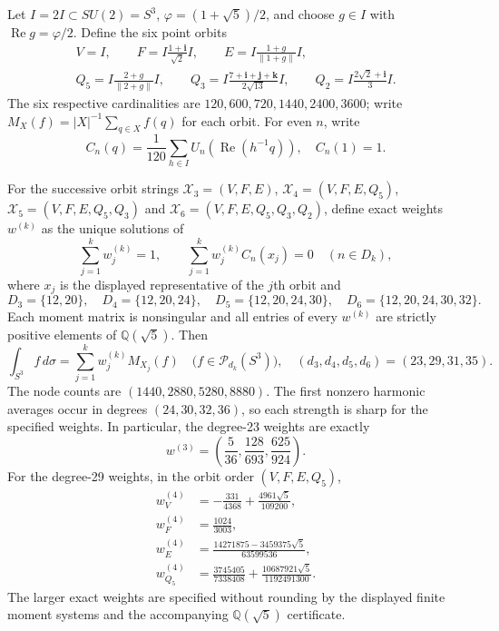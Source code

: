 \documentclass[11pt]{article}
\begin{document}
Let $I=2I\subset SU(2)=S^3$, $\varphi=(1+\sqrt5)/2$, and choose
$g\in I$ with $\operatorname{Re}g=\varphi/2$. Define the six point orbits
\[
\begin{gathered}
V=I,\qquad F=I\frac{1+\mathbf i}{\sqrt2}I,\qquad
E=I\frac{1+g}{\|1+g\|}I,\\
Q_5=I\frac{2+g}{\|2+g\|}I,\qquad
Q_3=I\frac{7+\mathbf i+\mathbf j+\mathbf k}{2\sqrt{13}}I,
\qquad Q_2=I\frac{2\sqrt2+\mathbf i}{3}I.
\end{gathered}
\]
The six respective cardinalities are $120,600,720,1440,2400,3600$;
write $M_X(f)=|X|^{-1}\sum_{q\in X}f(q)$ for each orbit.
For even $n$, write
\[
C_n(q)=\frac1{120}\sum_{h\in I}U_n(\operatorname{Re}(h^{-1}q)),
\quad C_n(1)=1.
\]

\begin{theorem}
\label{p1b:thm:cc110-positive-orbit-cubatures}
For the successive orbit strings
$\mathcal X_3=(V,F,E)$,
$\mathcal X_4=(V,F,E,Q_5)$,
$\mathcal X_5=(V,F,E,Q_5,Q_3)$ and
$\mathcal X_6=(V,F,E,Q_5,Q_3,Q_2)$, define exact weights
$w^{(k)}$ as the unique solutions of
\[
\sum_{j=1}^k w_j^{(k)}=1,\qquad
\sum_{j=1}^k w_j^{(k)}C_n(x_j)=0
\quad(n\in D_k),
\]
where $x_j$ is the displayed representative of the $j$th orbit and
\[
D_3=\{12,20\},\quad D_4=\{12,20,24\},\quad
D_5=\{12,20,24,30\},\quad
D_6=\{12,20,24,30,32\}.
\]
Each moment matrix is nonsingular and all entries of every $w^{(k)}$
are strictly positive elements of $\mathbb Q(\sqrt5)$. Then
\[
\boxed{\int_{S^3} f\,d\sigma=\sum_{j=1}^k w_j^{(k)}M_{X_j}(f)
\quad\bigl(f\in\mathcal P_{d_k}(S^3)\bigr),\quad
(d_3,d_4,d_5,d_6)=(23,29,31,35).}
\]
The node counts are $(1440,2880,5280,8880)$. The first nonzero
harmonic averages occur in degrees $(24,30,32,36)$, so each strength is
sharp for the specified weights.
In particular, the degree-23 weights are exactly
\[
\boxed{w^{(3)}=\left(\frac5{36},\frac{128}{693},\frac{625}{924}\right)}.
\]
For the degree-29 weights, in the orbit order $(V,F,E,Q_5)$,
\[
\begin{split}
w_V^{(4)}&=-\frac{331}{4368}+\frac{4961\sqrt5}{109200},\\
w_F^{(4)}&=\frac{1024}{3003},\\
w_E^{(4)}&=\frac{14271875-3459375\sqrt5}{63599536},\\
w_{Q_5}^{(4)}&=\frac{3745405}{7338408}
+\frac{10687921\sqrt5}{1192491300}.
\end{split}
\]
The larger exact weights are specified without rounding by the displayed
finite moment systems and the accompanying $\mathbb Q(\sqrt5)$ certificate.
\end{theorem}
\end{document}
